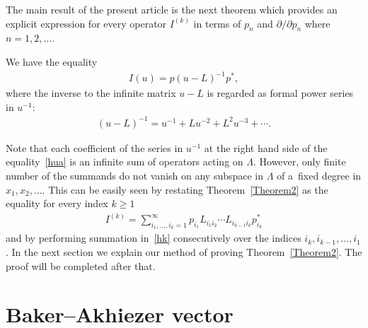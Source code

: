 \documentclass[pdftex]{sigma}
\numberwithin{equation}{section}
\renewcommand\ge{\geqslant}
\begin{document}
The main result of the present article is the next theorem which provides an explicit expression for every
operator $I^{(k)}$ in terms of $p_n$ and $\partial /\partial  p_{n}$ where
$n=1,2,\ldots$.
\begin{theorem}\label{Theorem2}
We have the equality
\begin{gather}
\label{hua}
I(u)=p(u-L)^{-1}p^{\ast},
\end{gather}
where the inverse to the infinite matrix $u-L$ is regarded as formal power series in $u^{-1}$:
\begin{gather*}
(u-L)^{-1}=u^{-1}+Lu^{-2}+L^2u^{-3}+\cdots.
\end{gather*}
\end{theorem}

Note that each coef\/f\/icient of the series in $u^{-1}$ at the right hand side of the
equality~\eqref{hua} is an inf\/inite sum of operators acting on $\Lambda$.
However, only f\/inite number of the summands do not vanish on any subspace in $\Lambda$ of a~f\/ixed
degree in $x_1,x_2,\ldots$.
This can be easily seen by restating Theorem~\ref{Theorem2} as the equality for every index $k\ge1$
\begin{gather}
\label{hk}
I^{(k)}=\sum_{i_1,\ldots,i_k=1}^\infty p_{i_1}
L_{i_1i_2}\cdots L_{i_{k-1}i_k}p^{\ast}_{i_k}
\end{gather}
and by performing summation in~\eqref{hk} consecutively over the indices $i_k,i_{k-1},\ldots,
i_1$.
In the next section we explain our method of proving Theorem~\ref{Theorem2}.
The proof will be completed after that.

\section[Baker-Akhiezer vector]{Baker--Akhiezer vector}\label{Section7}
\end{document}
